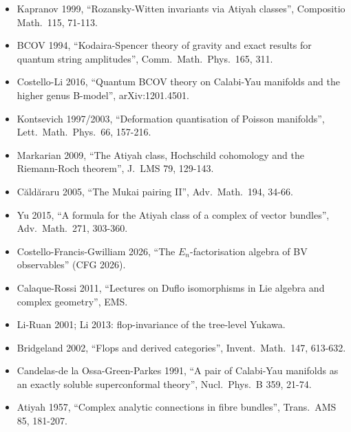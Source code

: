 \documentclass[11pt]{article}
\begin{document}
\begin{itemize}
\item Kapranov 1999, ``Rozansky-Witten invariants via Atiyah classes'',
Compositio Math.\ 115, 71-113.
\item BCOV 1994, ``Kodaira-Spencer theory of gravity and exact results
for quantum string amplitudes'', Comm.\ Math.\ Phys.\ 165, 311.
\item Costello-Li 2016, ``Quantum BCOV theory on Calabi-Yau manifolds
and the higher genus B-model'', arXiv:1201.4501.
\item Kontsevich 1997/2003, ``Deformation quantisation of Poisson
manifolds'', Lett.\ Math.\ Phys.\ 66, 157-216.
\item Markarian 2009, ``The Atiyah class, Hochschild cohomology and the
Riemann-Roch theorem'', J.\ LMS 79, 129-143.
\item C\u ald\u araru 2005, ``The Mukai pairing II'', Adv.\ Math.\ 194,
34-66.
\item Yu 2015, ``A formula for the Atiyah class of a complex of vector
bundles'', Adv.\ Math.\ 271, 303-360.
\item Costello-Francis-Gwilliam 2026, ``The $E_n$-factorisation algebra
of BV observables'' (CFG 2026).
\item Calaque-Rossi 2011, ``Lectures on Duflo isomorphisms in Lie
algebra and complex geometry'', EMS.
\item Li-Ruan 2001; Li 2013: flop-invariance of the tree-level Yukawa.
\item Bridgeland 2002, ``Flops and derived categories'', Invent.\ Math.\
147, 613-632.
\item Candelas-de la Ossa-Green-Parkes 1991, ``A pair of Calabi-Yau
manifolds as an exactly soluble superconformal theory'', Nucl.\ Phys.\
B 359, 21-74.
\item Atiyah 1957, ``Complex analytic connections in fibre bundles'',
Trans.\ AMS 85, 181-207.
\end{itemize}
\end{document}
